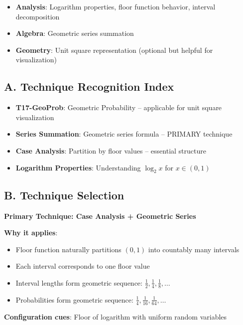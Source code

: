 \documentclass[11pt]{article}
\begin{document}
\begin{tacticalbox}
\begin{itemize}[leftmargin=*]
    \item \textbf{Analysis}: Logarithm properties, floor function behavior, interval decomposition
    
    \item \textbf{Algebra}: Geometric series summation
    
    \item \textbf{Geometry}: Unit square representation (optional but helpful for visualization)
\end{itemize}
\end{tacticalbox}

\begin{techniquesbox}
\subsection*{A. Technique Recognition Index}
\begin{itemize}[leftmargin=*]
    \item \textbf{T17-GeoProb}: Geometric Probability -- applicable for unit square visualization
    \item \textbf{Series Summation}: Geometric series formula -- PRIMARY technique
    \item \textbf{Case Analysis}: Partition by floor values -- essential structure
    \item \textbf{Logarithm Properties}: Understanding $\log_2 x$ for $x \in (0,1)$
\end{itemize}

\subsection*{B. Technique Selection}
\textbf{Primary Technique: Case Analysis + Geometric Series}

\textbf{Why it applies}:
\begin{itemize}
    \item Floor function naturally partitions $(0,1)$ into countably many intervals
    \item Each interval corresponds to one floor value
    \item Interval lengths form geometric sequence: $\frac{1}{2}, \frac{1}{4}, \frac{1}{8}, \ldots$
    \item Probabilities form geometric sequence: $\frac{1}{4}, \frac{1}{16}, \frac{1}{64}, \ldots$
\end{itemize}

\textbf{Configuration cues}: Floor of logarithm with uniform random variables


\end{techniquesbox}
\end{document}
